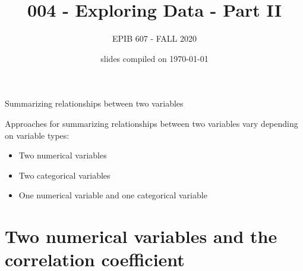 \documentclass[10pt]{beamer}\usepackage[]{graphicx}\usepackage[]{color}
\begin{document}
	
	
	
	
	\title{004 - Exploring Data - Part II}
	\author{EPIB 607 - FALL 2020}
	
	\date{slides compiled on \today}
	
	\maketitle

	
	

						
\begin{frame}{Summarizing relationships between two variables}
							\protect\hypertarget{summarizing-relationships-between-two-variables}{}
							
							Approaches for summarizing relationships between two variables vary
							depending on variable types:
							
							\begin{itemize}
								\item
								Two numerical variables
								\item
								Two categorical variables
								\item
								One numerical variable and one categorical variable
							\end{itemize}
							
\end{frame}


\section{Two numerical variables and the correlation coefficient}
\end{document}
